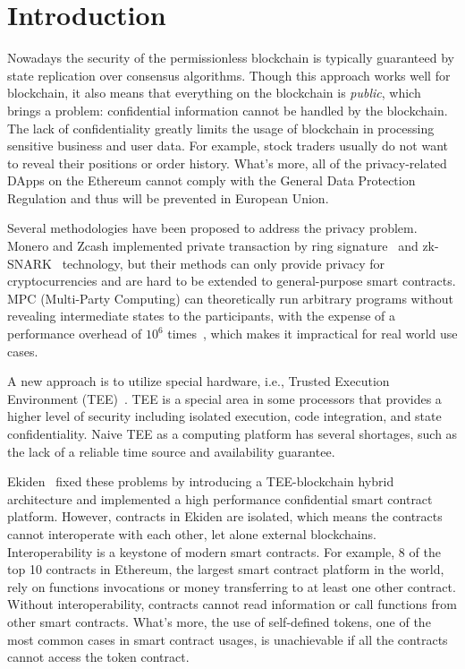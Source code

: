 \section{Introduction}

Nowadays the security of the permissionless blockchain is typically guaranteed by state replication over consensus algorithms. Though this approach works well for blockchain, it also means that everything on the blockchain is \textit{public}, which brings a problem: confidential information cannot be handled by the blockchain. The lack of confidentiality greatly limits the usage of blockchain in processing sensitive business and user data. For example, stock traders usually do not want to reveal their positions or order history.
What's more, all of the privacy-related DApps on the Ethereum cannot comply with the General Data Protection Regulation and thus will be prevented in European Union.

Several methodologies have been proposed to address the privacy problem. Monero and Zcash implemented private transaction by ring signature~\cite{van2013cryptonote} and zk-SNARK~\cite{sasson2014zerocash} technology, but their methods can only provide privacy for cryptocurrencies and are hard to be extended to general-purpose smart contracts. MPC (Multi-Party Computing) can theoretically run arbitrary programs without revealing intermediate states to the participants, with the expense of a performance overhead of $10^6$ times~\cite{cheng2019ekiden}, which makes it impractical for real world use cases.

A new approach is to utilize special hardware, i.e., Trusted Execution Environment (TEE)~\cite{teewiki}. TEE is a special area in some processors that provides a higher level of security including isolated execution, code integration, and state confidentiality. Naive TEE as a computing platform has several shortages, such as the lack of a reliable time source and availability guarantee.

Ekiden~\cite{cheng2019ekiden} fixed these problems by introducing a TEE-blockchain hybrid architecture and implemented a high performance confidential smart contract platform. However, contracts in Ekiden are isolated, which means the contracts cannot interoperate with each other, let alone external blockchains. Interoperability is a keystone of modern smart contracts. For example, 8 of the top 10 contracts in Ethereum, the largest smart contract platform in the world, rely on functions invocations or money transferring to at least one other contract. Without interoperability, contracts cannot read information or call functions from other smart contracts. What's more, the use of self-defined tokens, one of the most common cases in smart contract usages, is unachievable if all the contracts cannot access the token contract.


